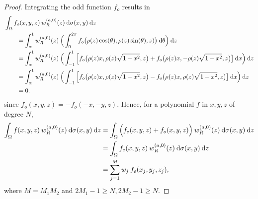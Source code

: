 \documentclass[11pt, oneside]{article}   	%
\newcommand{\genjac}{R}
\newcommand{\genjacw}{w_\genjac}
\begin{document}
\begin{proof}
Integrating the odd function $f_o$ results in
\begin{align*}
	&\int_\Omega f_o(x,y,z) \: \genjacw^{(a,0)}(z) \: \D \sigma(x,y) \: \D z \\
	&\quad \quad = \int_\alpha^1 \genjacw^{(a,0)}(z) \: \Big( \int_0^{2\pi} f_o\big(\rho(z)\cos(\theta),\rho(z)\sin(\theta), z)\big) \: \D \theta \Big) \: \D z \\
	&\quad \quad = \int_\alpha^1 \genjacw^{(a,0)}(z) \: \Big( \int_{-1}^1 \Big[ f_o\big(\rho(z)x,\rho(z)\sqrt{1-x^2}, z\big) + f_o\big(\rho(z)x, - \rho(z)\sqrt{1-x^2}, z\big) \big] \: \D x \Big) \: \D z \\
	&\quad \quad = \int_\alpha^1 \genjacw^{(a,0)}(z) \: \Big( \int_{-1}^1 \Big[ f_o\big(\rho(z)x,\rho(z)\sqrt{1-x^2}, z\big) - f_o\big(\rho(z)x, \rho(z)\sqrt{1-x^2}, z\big) \big] \: \D x \Big) \: \D z \\
	&\quad \quad = 0.
\end{align*}
since $f_o(x,y,z) = - f_o(-x, -y, z)$. Hence, for a polynomial $f$ in $x,y,z$ of degree $N$,
\begin{align*}
	\int_\Omega f(x,y,z) \: \genjacw^{(a,0)}(z) \: \D \sigma(x,y) \: \D z &= \int_\Omega \Big(f_e(x,y,z) + f_o(x,y,z)\Big) \:  \genjacw^{(a,0)}(z) \: \D \sigma(x,y) \: \D z  \\
	&= \int_\Omega f_e(x,y,z) \: \genjacw^{(a,0)}(z) \: \D \sigma(x,y) \: \D z \\
	&= \sum_{j=1}^{M}  w_j \: f_e(x_j, y_j, z_j),
\end{align*}
where $M = M_1 M_2$ and $2M_1 - 1 \ge N, 2M_2 - 1 \ge N$.
\end{proof}
\end{document}

